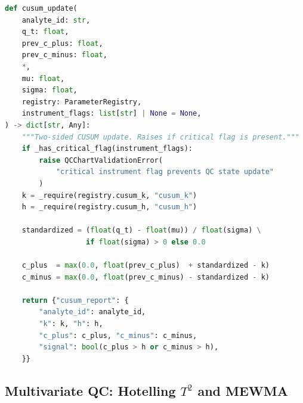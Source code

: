 \documentclass[11pt,a4paper]{article}
\begin{document}
\begin{lstlisting}[language=Python,
  caption={CUSUM update with freeze guard (\texttt{qc\_univariate.py})},
  label={lst:cusum}]
def cusum_update(
    analyte_id: str,
    q_t: float,
    prev_c_plus: float,
    prev_c_minus: float,
    *,
    mu: float,
    sigma: float,
    registry: ParameterRegistry,
    instrument_flags: list[str] | None = None,
) -> dict[str, Any]:
    """Two-sided CUSUM update. Raises if critical flag is present."""
    if _has_critical_flag(instrument_flags):
        raise QCChartValidationError(
            "critical instrument flag prevents QC state update"
        )
    k = _require(registry.cusum_k, "cusum_k")
    h = _require(registry.cusum_h, "cusum_h")

    standardized = (float(q_t) - float(mu)) / float(sigma) \
                   if float(sigma) > 0 else 0.0

    c_plus  = max(0.0, float(prev_c_plus)  + standardized - k)
    c_minus = max(0.0, float(prev_c_minus) - standardized - k)

    return {"cusum_report": {
        "analyte_id": analyte_id,
        "k": k, "h": h,
        "c_plus": c_plus, "c_minus": c_minus,
        "signal": bool(c_plus > h or c_minus > h),
    }}
\end{lstlisting}

\subsection{Multivariate QC: Hotelling $T^2$ and MEWMA}
\end{document}
